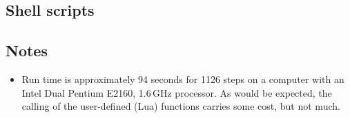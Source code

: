 \subsection{Shell scripts}
\label{cone20-udf-sh-files}
\topbar

\bottombar

\subsection{Notes}
\begin{itemize}
\item Run time is approximately 94 seconds for 1126 steps on a computer with 
      an Intel Dual Pentium E2160, 1.6\,GHz processor.  
      As would be expected, the calling of the user-defined (Lua) functions
      carries some cost, but not much.
\end{itemize}
